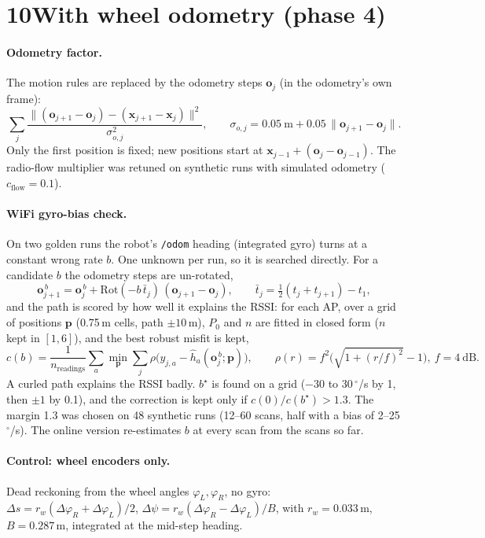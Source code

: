 \documentclass[11pt]{article}
\newcommand{\x}{\mathbf{x}}
\newcommand{\p}{\mathbf{p}}
\newcommand{\ob}{\mathbf{o}}
\begin{document}
\section*{10\quad With wheel odometry (phase 4)}
\paragraph{Odometry factor.} The motion rules are replaced by the odometry steps $\ob_j$ (in the odometry's own frame):
\begin{equation}
\sum_j\frac{\big\lVert(\ob_{j+1}-\ob_j)-(\x_{j+1}-\x_j)\big\rVert^2}{\sigma_{o,j}^2},\qquad
\sigma_{o,j}=0.05\ \text{m}+0.05\,\lVert\ob_{j+1}-\ob_j\rVert .
\end{equation}
Only the first position is fixed; new positions start at $\x_{j-1}+(\ob_j-\ob_{j-1})$. The radio-flow multiplier
was retuned on synthetic runs with simulated odometry ($c_{\text{flow}}=0.1$).

\paragraph{WiFi gyro-bias check.} On two golden runs the robot's \texttt{/odom} heading (integrated gyro) turns at
a constant wrong rate $b$. One unknown per run, so it is searched directly. For a candidate $b$ the odometry
steps are un-rotated,
\begin{equation}
\ob^{\,b}_{j+1}=\ob^{\,b}_j+\mathrm{Rot}(-b\,\bar t_j)\,(\ob_{j+1}-\ob_j),\qquad \bar t_j=\tfrac12(t_j+t_{j+1})-t_1,
\end{equation}
and the path is scored by how well it explains the RSSI: for each AP, over a grid of positions $\p$ (0.75\,m
cells, path $\pm10$\,m), $P_0$ and $n$ are fitted in closed form ($n$ kept in $[1,6]$), and the best robust misfit is kept,
\begin{equation}
c(b)=\frac{1}{n_{\text{readings}}}\sum_a\min_{\p}\sum_j\rho\big(y_{j,a}-\hat h_a(\ob^{\,b}_j;\p)\big),\qquad
\rho(r)=f^2\Big(\sqrt{1+(r/f)^2}-1\Big),\ f=4\ \text{dB}.
\end{equation}
A curled path explains the RSSI badly. $b^\star$ is found on a grid ($-30$ to $30\,^\circ$/s by 1, then $\pm1$ by 0.1),
and the correction is kept only if $c(0)/c(b^\star)>1.3$. The margin 1.3 was chosen on 48 synthetic runs (12--60
scans, half with a bias of 2--25\,$^\circ$/s). The online version re-estimates $b$ at every scan from the scans so far.

\paragraph{Control: wheel encoders only.} Dead reckoning from the wheel angles $\varphi_L,\varphi_R$, no gyro:
$\Delta s=r_w(\Delta\varphi_R+\Delta\varphi_L)/2$, $\Delta\psi=r_w(\Delta\varphi_R-\Delta\varphi_L)/B$, with
$r_w=0.033$\,m, $B=0.287$\,m, integrated at the mid-step heading.
\end{document}
